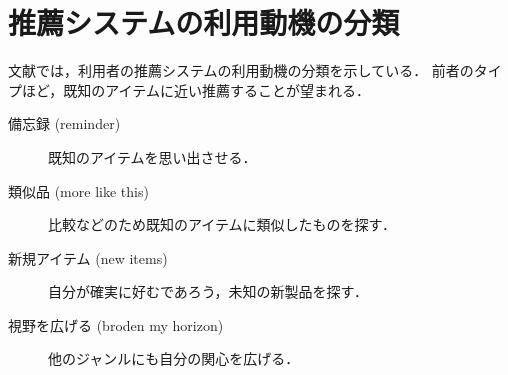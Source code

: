 \section{推薦システムの利用動機の分類}
\label{sec:usertarget}

文献\cite{sigir:01:01}では，利用者の推薦システムの利用動機の分類を示している．
前者のタイプほど，既知のアイテムに近い推薦することが望まれる．
\begin{description}
 \item[備忘録 (reminder)] 既知のアイテムを思い出させる．
 \item[類似品 (more like this)] 比較などのため既知のアイテムに類似したものを探す．
 \item[新規アイテム (new items)] 自分が確実に好むであろう，未知の新製品を探す．
 \item[視野を広げる (broden my horizon)] 他のジャンルにも自分の関心を広げる．
\end{description}

